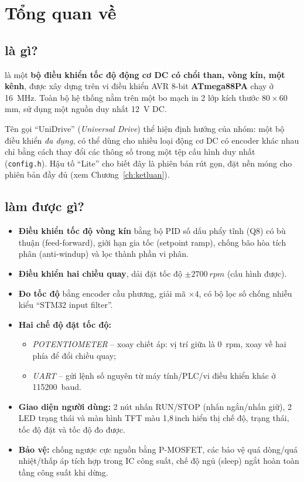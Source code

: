 \section{Tổng quan về \proj}

\subsection{\proj{} là gì?}
\textbf{\proj} là một \textbf{bộ điều khiển tốc độ động cơ DC có chổi than, vòng kín, một kênh}, được xây dựng trên vi điều khiển AVR 8-bit \textbf{ATmega88PA} chạy ở \SI{16}{\mega\hertz}. Toàn bộ hệ thống nằm trên một bo mạch in 2 lớp kích thước 80\,$\times$\,60\,mm, sử dụng một nguồn duy nhất \SI{12}{\volt} DC.

Tên gọi ``UniDrive'' (\emph{Universal Drive}) thể hiện định hướng của nhóm: một bộ điều khiển \emph{đa dụng}, có thể dùng cho nhiều loại động cơ DC có encoder khác nhau chỉ bằng cách thay đổi các thông số trong một tệp cấu hình duy nhất (\texttt{config.h}). Hậu tố ``Lite'' cho biết đây là phiên bản rút gọn, đặt nền móng cho phiên bản đầy đủ \projpro{} (xem Chương~\ref{ch:ketluan}).

\subsection{\proj{} làm được gì?}
\begin{itemize}
  \item \textbf{Điều khiển tốc độ vòng kín} bằng bộ PID số dấu phẩy tĩnh (Q8) có bù thuận (feed-forward), giới hạn gia tốc (setpoint ramp), chống bão hòa tích phân (anti-windup) và lọc thành phần vi phân.
  \item \textbf{Điều khiển hai chiều quay}, dải đặt tốc độ $\pm\SI{2700}{rpm}$ (cấu hình được).
  \item \textbf{Đo tốc độ} bằng encoder cầu phương, giải mã $\times4$, có bộ lọc số chống nhiễu kiểu ``STM32 input filter''.
  \item \textbf{Hai chế độ đặt tốc độ:}
    \begin{itemize}
      \item \emph{POTENTIOMETER} -- xoay chiết áp: vị trí giữa là \SI{0}{rpm}, xoay về hai phía để đổi chiều quay;
      \item \emph{UART} -- gửi lệnh số nguyên từ máy tính/PLC/vi điều khiển khác ở \SI{115200}{baud}.
    \end{itemize}
  \item \textbf{Giao diện người dùng:} 2 nút nhấn RUN/STOP (nhấn ngắn/nhấn giữ), 2 LED trạng thái và màn hình TFT màu 1,8\,inch hiển thị chế độ, trạng thái, tốc độ đặt và tốc độ đo được.
  \item \textbf{Bảo vệ:} chống ngược cực nguồn bằng P-MOSFET, các bảo vệ quá dòng/quá nhiệt/thấp áp tích hợp trong IC công suất, chế độ ngủ (sleep) ngắt hoàn toàn tầng công suất khi dừng.
\end{itemize}


